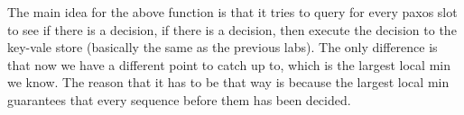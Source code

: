 \documentclass[a4paper]{article}
\begin{document}
The main idea for the above function is that it tries to query for every paxos slot to see if there is a decision, if there is a decision, then execute the decision to the key-vale store (basically the same as the previous labs).
The only difference is that now we have a different point to catch up to, which is the largest local min we know.
The reason that it has to be that way is because the largest local min guarantees that every sequence before them has been decided.
\end{document}
